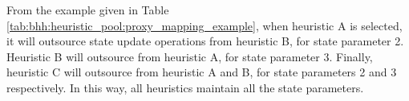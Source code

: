 \begin{table}[htbp]
      \centering
      \caption{State update operation proxy mapping example.}
      \label{tab:bhh:heuristic_pool:proxy_mapping_example}%
      \par\bigskip
\end{table}%

From the example given in Table \ref{tab:bhh:heuristic_pool:proxy_mapping_example}, when heuristic A is selected, it will outsource state update operations from heuristic B, for state parameter 2. Heuristic B will outsource from heuristic A, for state parameter 3. Finally, heuristic C will outsource from heuristic A and B, for state parameters 2 and 3 respectively. In this way, all heuristics maintain all the state parameters.

